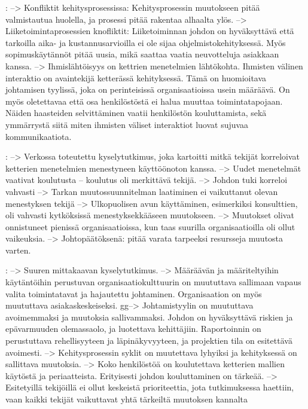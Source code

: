 :
--> Konfliktit kehitysprosessissa: Kehitysprosessin muutokseen pitää
valmistautua huolella, ja prosessi pitää rakentaa alhaalta ylös. \newline
--> Liiketoimintaprosessien knofliktit: Liiketoiminnan johdon on hyväksyttävä
että tarkoilla aika- ja kustannusarvioilla ei ole sijaa ohjelmistokehityksessä.
Myös sopimuskäytännöt pitää uusia, mikä saattaa vaatia neuvotteluja asiakkaan
kanssa. \newline
--> Ihmislähtöisyys on kettrien menetelmien lähtökohta. Ihmisten välinen
interaktio on avaintekijä ketterässä kehityksessä. Tämä on huomioitava
johtamisen tyylissä, joka on perinteisissä organisaatioissa usein määräävä. On
myös oletettavaa että osa henkilöstöstä ei halua muuttaa toimintatapojaan.
Näiden haasteiden selvittäminen vaatii henkilöstön kouluttamista, sekä
ymmärrystä siitä miten ihmisten väliset interaktiot luovat sujuvaa
kommunikaatiota.

:
--> Verkossa toteutettu kyselytutkimus, joka kartoitti mitkä tekijät korreloivat
ketterien menetelmien menestyneen käyttöönoton kanssa. \newline
--> Uudet menetelmät vaativat koulutusta -- koulutus oli merkittävä tekijä. \newline
--> Johdon tuki korreloi vahvasti \newline
--> Tarkan muutossuunnitelman laatiminen ei vaikuttanut olevan menestyksen tekijä \newline
--> Ulkopuolisen avun käyttäminen, esimerkiksi konsulttien, oli vahvasti
kytköksissä menestyksekkääseen muutokseen. \newline
--> Muutokset olivat onnistuneet pienissä organisaatioissa, kun taas suurilla
organisaatioilla oli ollut vaikeuksia. \newline
--> Johtopäätöksenä: pitää varata tarpeeksi resursseja muutosta varten.

:
--> Suuren mittakaavan kyselytutkimus. \newline
--> Määräävän ja määriteltyihin käytäntöihin perustuvan organisaatiokulttuurin
on muututtava sallimaan vapaus valita toimintatavat ja hajautettu johtaminen.
Organisaation on myös muututtava asiakaskeskeiseksi. \newline
gg--> Johtamistyylin on muututtava avoimemmaksi ja muutoksia sallivammaksi.
Johdon on hyväksyttävä riskien ja epävarmuuden olemassaolo, ja luotettava kehittäjiin.
Raportoinnin on perustuttava rehellisyyteen ja läpinäkyvyyteen, ja projektien
tila on esitettävä avoimesti. \newline 
--> Kehitysprosessin syklit on muutettava lyhyiksi ja kehityksessä on sallittava
muutoksia. \newline
--> Koko henkilöstöä on koulutettava ketterien mallien käytöstä ja periaatteista.
Erityisesti johdon kouluttaminen on tärkeää. \newline
--> Esitetyillä tekijöillä ei ollut keskeistä prioriteettia, jota tutkimuksessa
haettiin, vaan kaikki tekijät vaikuttavat yhtä tärkeiltä muutoksen kannalta

